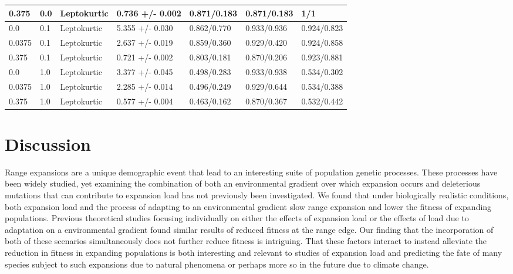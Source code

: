 \begin{table}[h]
\begin{tabular}{p{}|p{}|p{}|p{}|p{}|p{}|p{}}
0.375                     	&	0.0	& Leptokurtic      &	0.736 +/- 0.002	&	0.871/0.183	&	0.871/0.183	&	1/1	\\ \hline
0.0                       	&	0.1	& Leptokurtic      &	5.355 +/- 0.030	&	0.862/0.770	&	0.933/0.936	&	0.924/0.823	\\
0.0375                    	&	0.1	& Leptokurtic      &	2.637 +/- 0.019	&	0.859/0.360	&	0.929/0.420	&	0.924/0.858	\\
0.375                     	&	0.1	& Leptokurtic      &	0.721 +/- 0.002	&	0.803/0.181	&	0.870/0.206	&	0.923/0.881	\\ \hline
0.0                       	&	1.0	& Leptokurtic      &	3.377 +/- 0.045	&	0.498/0.283	&	0.933/0.938	&	0.534/0.302	\\
0.0375                    	&	1.0	& Leptokurtic      &	2.285 +/- 0.014	&	0.496/0.249	&	0.929/0.644	&	0.534/0.388	\\
0.375                     	&	1.0	& Leptokurtic      &	0.577 +/- 0.004	&	0.463/0.162	&	0.870/0.367	&	0.532/0.442	\\ \hline
\end{tabular}
\end{table}








\section{Discussion}



Range expansions are a unique demographic event that lead to an interesting suite of population genetic processes. These processes have been widely studied, yet examining the combination of both an environmental gradient over which expansion occurs and deleterious mutations that can contribute to expansion load has not previously been investigated. We found that under biologically realistic conditions, both expansion load and the process of adapting to an environmental gradient slow range expansion and lower the fitness of expanding populations. Previous theoretical studies focusing individually on either the effects of expansion load or the effects of load due to adaptation on a environmental gradient found similar results of reduced fitness at the range edge. Our finding that the incorporation of both of these scenarios simultaneously does not further reduce fitness is intriguing. That these factors interact to instead alleviate the reduction in fitness in expanding populations is both interesting and relevant to studies of expansion load and predicting the fate of many species subject to such expansions due to natural phenomena or perhaps more so in the future due to climate change.

